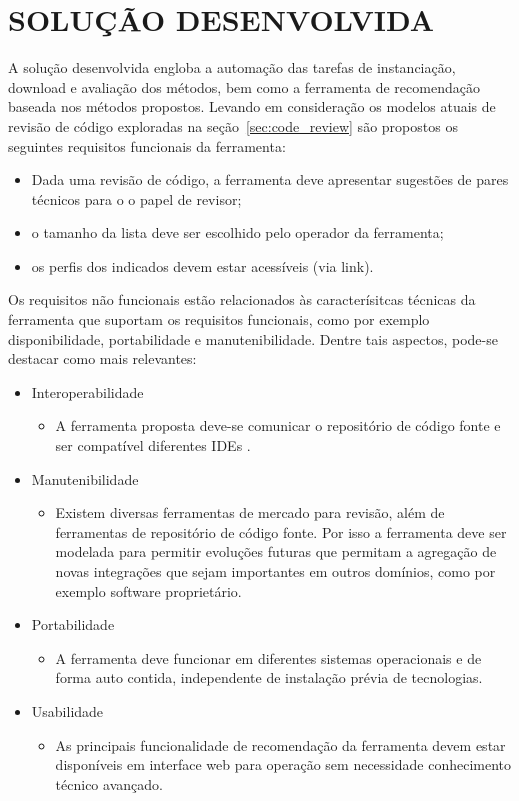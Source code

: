 \documentclass[12pt,openany,oneside,a4paper,english,brazil]{abntbibufjf}
\begin{document}
\chapter{SOLUÇÃO DESENVOLVIDA}\label{chap:solucao}
    A solução desenvolvida engloba a automação das tarefas de instanciação, download e avaliação dos métodos, bem como a ferramenta de recomendação baseada nos métodos propostos. Levando em consideração os modelos atuais de revisão de código exploradas na seção~\ref{sec:code_review} são propostos os seguintes requisitos funcionais da ferramenta:
		\begin{itemize}
			\item Dada uma revisão de código, a ferramenta deve apresentar sugestões de pares técnicos para o o papel de revisor;
			\item o tamanho da lista deve ser escolhido pelo operador da ferramenta;
			\item os perfis dos indicados devem estar acessíveis (via link).
		\end{itemize}


		Os requisitos não funcionais estão relacionados às caracterísitcas técnicas da ferramenta que suportam os requisitos funcionais, como por exemplo disponibilidade, portabilidade e manutenibilidade. Dentre tais aspectos, pode-se destacar como mais relevantes:
	\begin{itemize}
		\item Interoperabilidade
		\begin{itemize}
			\item A ferramenta proposta deve-se comunicar o repositório de código fonte e ser compatível diferentes IDEs .
		\end{itemize}
		\item Manutenibilidade
		\begin{itemize}
			\item Existem diversas ferramentas de mercado para revisão, além de ferramentas de repositório de código fonte. Por isso a ferramenta deve ser modelada para permitir evoluções futuras que permitam a agregação de novas integrações que sejam importantes em outros domínios, como por exemplo software proprietário.
		\end{itemize}
    \item Portabilidade
    \begin{itemize}
      \item A ferramenta deve funcionar em diferentes sistemas operacionais e de forma auto contida, independente de instalação prévia de tecnologias.
    \end{itemize}
    \item Usabilidade
    \begin{itemize}
      \item As principais funcionalidade de recomendação da ferramenta devem estar disponíveis em interface web para operação sem necessidade conhecimento técnico avançado.
    \end{itemize}
	\end{itemize}
\end{document}
